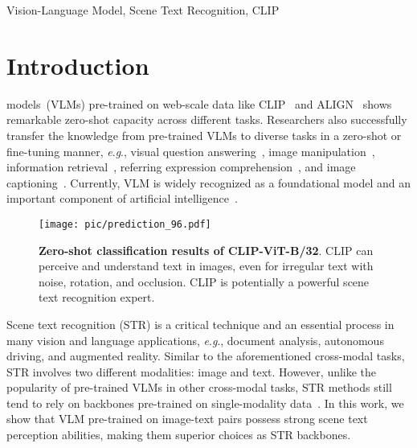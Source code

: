 \documentclass[lettersize,journal]{IEEEtran}
\newcommand{\eg}{\textit{e}.\textit{g}.}
\begin{document}
\begin{IEEEkeywords}
Vision-Language Model, Scene Text Recognition, CLIP
\end{IEEEkeywords}




\section{Introduction} \label{sec-intro}
 models~(VLMs)
pre-trained on web-scale data
like CLIP~\cite{2021-clip} and ALIGN~\cite{2021-align} shows
remarkable zero-shot capacity across different tasks.
Researchers also successfully transfer the knowledge from pre-trained VLMs to diverse tasks in a zero-shot or fine-tuning manner,
\eg, visual question answering~\cite{2022_haoyu_clip},
image manipulation~\cite{2021_styleclip,2022_DiffusionCLIP},
information retrieval~\cite{2022_clip4clip},
referring expression comprehension~\cite{2022_reclip},
and image captioning~\cite{2021_CLIPScore}.
Currently, VLM is widely recognized as a foundational model and an important component of artificial intelligence~\cite{fei2022towards}.


\begin{figure}[!t]
	\centering
	\texttt{[image: pic/prediction\_96.pdf]}
	\caption{\textbf{Zero-shot classification results of CLIP-ViT-B/32}. CLIP can perceive and understand text in images, even for irregular text with noise, rotation, and occlusion.
 CLIP is potentially a powerful scene text recognition expert.}
	\label{fig:clip_0shot}
\end{figure}

Scene text recognition (STR) is a critical technique and an essential process in many vision and language applications, \eg, document analysis,
autonomous driving, and augmented reality.
Similar to the aforementioned cross-modal tasks,
STR involves two different modalities: image and text.
However, unlike the popularity of pre-trained VLMs in other cross-modal tasks, STR methods still tend to rely on backbones pre-trained on single-modality data~\cite{2021_abinet,atienza2021vision,yang2022reading,li2021trocr}.
In this work, we show that VLM pre-trained on image-text pairs possess strong scene text perception abilities, making them superior choices as STR backbones.
\end{document}
